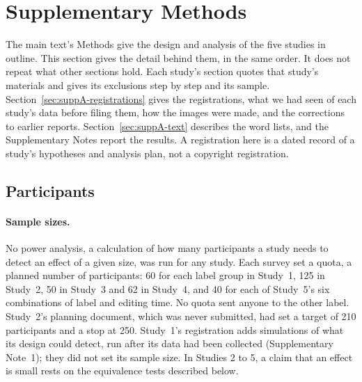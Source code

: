\section{Supplementary Methods}\label{sec:supp-methods}

The main text's Methods give the design and analysis of the five studies in outline. This section gives the detail behind them, in the same order. It does not repeat what other sections hold. Each study's section quotes that study's materials and gives its exclusions step by step and its sample. Section~\ref{sec:suppA-registrations} gives the registrations, what we had seen of each study's data before filing them, how the images were made, and the corrections to earlier reports. Section~\ref{sec:suppA-text} describes the word lists, and the Supplementary Notes report the results. A registration here is a dated record of a study's hypotheses and analysis plan, not a copyright registration.

\subsection*{Participants}

\paragraph*{Sample sizes.}
No power analysis, a calculation of how many participants a study needs to detect an effect of a given size, was run for any study. Each survey set a quota, a planned number of participants: 60 for each label group in Study~1, 125 in Study~2, 50 in Study~3 and 62 in Study~4, and 40 for each of Study~5's six combinations of label and editing time. No quota sent anyone to the other label. Study~2's planning document, which was never submitted, had set a target of 210 participants and a stop at 250. Study~1's registration adds simulations of what its design could detect, run after its data had been collected (Supplementary Note~1); they did not set its sample size. In Studies 2 to 5, a claim that an effect is small rests on the equivalence tests described below.

